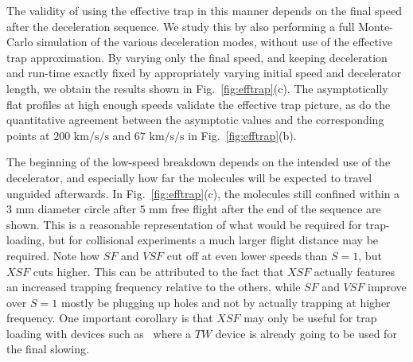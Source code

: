\documentclass[%
 reprint,
 amsmath,amssymb,
 aps,
prl,
]{revtex4-1}
\begin{document}
The validity of using the effective trap in this manner depends on the final speed after the deceleration sequence.
We study this by also performing a full Monte-Carlo simulation of the various deceleration modes, without use of the effective trap approximation.
By varying only the final speed, and keeping deceleration and run-time exactly fixed by appropriately varying initial speed and decelerator length, we obtain the results shown in Fig.~\ref{fig:efftrap}(c). 
The asymptotically flat profiles at high enough speeds validate the effective trap picture, as do the quantitative agreement between the asymptotic values and the corresponding points at $200\text{ km/s/s}$ and $67\text{ km/s/s}$ in Fig.~\ref{fig:efftrap}(b). 

The beginning of the low-speed breakdown depends on the intended use of the decelerator, and especially how far the molecules will be expected to travel unguided afterwards. 
In Fig.~\ref{fig:efftrap}(c), the molecules still confined within a $3\text{ mm}$ diameter circle after $5\text{ mm}$ free flight after the end of the sequence are shown. 
This is a reasonable representation of what would be required for trap-loading, but for collisional experiments a much larger flight distance may be required.
Note how $SF$ and $VSF$ cut off at even lower speeds than $S=1$, but $XSF$ cuts higher. 
This can be attributed to the fact that $XSF$ actually features an increased trapping frequency relative to the others, while $SF$ and $VSF$ improve over $S=1$ mostly be plugging up holes and not by actually trapping at higher frequency.
One important corollary is that $XSF$ may only be useful for trap loading with devices such as~\cite{} where a $TW$ device is already going to be used for the final slowing.
\end{document}

